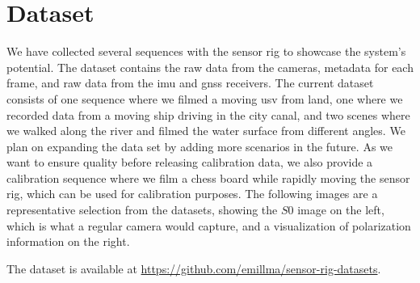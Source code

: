 

\section{Dataset}
We have collected several sequences with the sensor rig to showcase the system's potential.
The dataset contains the raw data from the cameras, metadata for each frame, and raw data from the \gls{imu} and \gls{gnss} receivers.
The current dataset consists of one sequence where we filmed a moving \gls{usv} from land, one where we recorded data from a moving ship driving in the city canal, and two scenes where we walked along the river and filmed the water surface from different angles.
We plan on expanding the data set by adding more scenarios in the future.
As we want to ensure quality before releasing calibration data, we also provide a calibration sequence where we film a chess board while rapidly moving the sensor rig, which can be used for calibration purposes.
The following images are a representative selection from the datasets, showing the $S0$ image on the left, which is what a regular camera would capture, and a visualization of polarization information on the right.

The dataset is available at \url{https://github.com/emillma/sensor-rig-datasets}.

